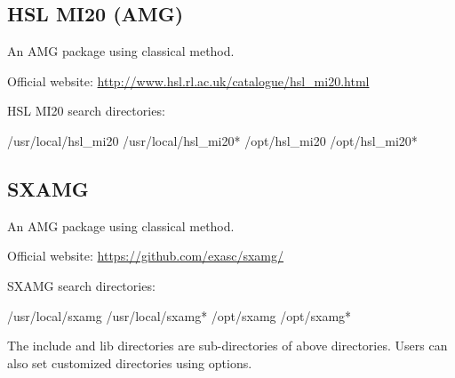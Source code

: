 \subsection{HSL MI20 (AMG)}
An AMG package using classical method. 

Official website: \url{http://www.hsl.rl.ac.uk/catalogue/hsl_mi20.html}

HSL MI20 search directories:
\begin{evb}
/usr/local/hsl_mi20
/usr/local/hsl_mi20*
/opt/hsl_mi20
/opt/hsl_mi20*
\end{evb}

\subsection{SXAMG}
An AMG package using classical method. 

Official website: \url{https://github.com/exasc/sxamg/}

SXAMG search directories:
\begin{evb}
/usr/local/sxamg
/usr/local/sxamg*
/opt/sxamg
/opt/sxamg*
\end{evb}

The include and lib directories are sub-directories of above directories. Users can also set customized directories using options.

